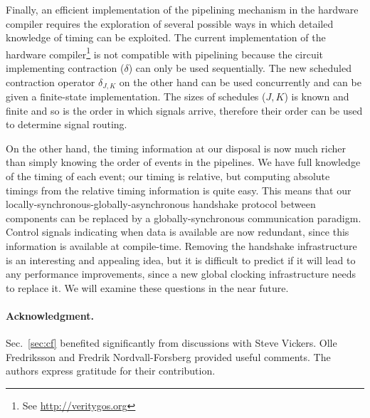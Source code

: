 \documentclass{article}
\begin{document}
Finally, an efficient implementation of the pipelining mechanism in the hardware compiler requires the exploration of several possible ways in which detailed knowledge of timing can be exploited. The current implementation of the hardware compiler\footnote{See \url{http://veritygos.org}} is not compatible with pipelining because the circuit implementing contraction ($\delta$) can only be used sequentially. The new scheduled contraction operator $\delta_{J,K}$ on the other hand can be used concurrently and can be given a finite-state implementation. The sizes of schedules ($J,K$) is known and finite and so is the order in which signals arrive, therefore their order can be used to determine signal routing. 

On the other hand, the timing information at our disposal is now much richer than simply knowing the order of events in the pipelines. We have full knowledge of the timing of each event; our timing is relative, but computing absolute timings from the relative timing information is quite easy. This means that our locally-synchronous-globally-asynchronous handshake protocol between components can be replaced by a globally-synchronous communication paradigm. Control signals indicating when data is available are now redundant, since this information is available at compile-time. Removing the handshake infrastructure is an interesting and appealing idea, but it is difficult to predict if it will lead to any performance improvements, since a new global clocking infrastructure needs to replace it. We will examine these questions in the near future. 


\paragraph{Acknowledgment.}
Sec.~\ref{sec:cf} benefited significantly from discussions with Steve Vickers. Olle Fredriksson and Fredrik Nordvall-Forsberg provided useful comments. The authors express gratitude for their contribution. 



\end{document}
